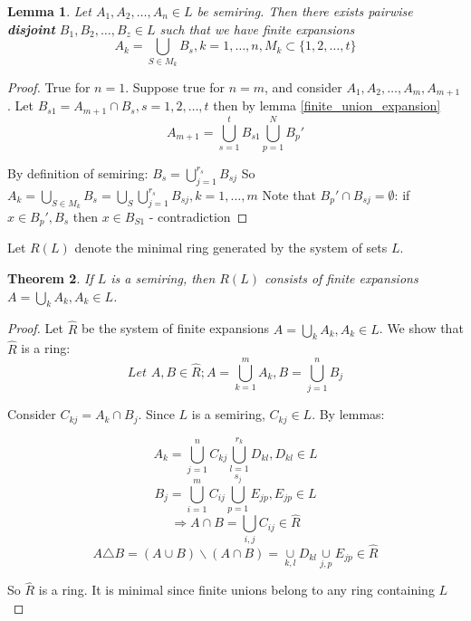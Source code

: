 \documentclass[11pt,a4paper]{report}
\newtheorem{theorem}{Theorem}[section]
\newtheorem{lemma}[theorem]{Lemma}
\theoremstyle{plain}
\theoremstyle{definition}
\theoremstyle{remark}
\begin{document}

\begin{lemma}
  \label{disjoint_countable_union_expansion}
  Let $A_1, A_2, \dots, A_n \in L$ be semiring.
  Then there exists pairwise \textbf{disjoint} $B_1, B_2, \dots, B_z \in L$ such that we have finite expansions
    \[ A_k = \underset{S\in M_k}{\bigcup}B_s, k=1, \dots, n, M_k \subset \{1,2,\dots, t\} \]
\end{lemma} 

\begin{proof}
    True for $n=1$.
    Suppose true for $n=m$, and consider $A_1, A_2, \dots, A_m, A_{m+1}$.
    Let $B_{s1} = A_{m+1} \cap B_s, s=1,2,\dots, t$
    then by lemma \ref{finite_union_expansion}
    \[ A_{m+1} = \bigcup_{s=1}^t B_{s1} \bigcup_{p=1}^N B_p' \]

    By definition of semiring: $B_s = \bigcup_{j=1}^{r_s} B_{sj}$
    So $A_k = \underset{S\in M_k}{\bigcup}B_s = \underset{S}{\bigcup}\bigcup_{j=1}^{r_s} B_{sj}, k=1,\dots, m$
    Note that $B_p' \cap B_{sj} = \emptyset$: if $x\in B_p', B_s$ then $x \in B_{S1}$ - contradiction
\end{proof}

Let $R(L)$ denote the minimal ring generated by the system of sets $L$.

\begin{theorem}
  If $L$ is a semiring, then $R(L)$ consists of finite expansions $A=\underset{k}{\bigcup} A_k, A_k \in L$.
\end{theorem}

\begin{proof}
  Let $\hat{R}$  be the system of finite expansions $A=\underset{k}{\bigcup} A_k, A_k \in L$. We show that $\hat{R}$ is a ring:\\

  \[ \textit{Let } A, B \in \hat{R}; A= \bigcup_{k=1}^m A_k, B=\bigcup_{j=1}^n B_j\]
  
  Consider $C_{kj}= A_k \cap B_j$. Since $L$ is a semiring, $C_{kj} \in L$.
  By lemmas: 

  \[ A_k = \bigcup_{j=1}^n C_{kj} \bigcup_{l=1}^{r_k} D_{kl}, D_{kl} \in L \]
  \[ B_j = \bigcup_{i=1}^m C_{ij} \bigcup_{p=1}^{s_j} E_{jp}, E_{jp} \in L \]
  \[ \Rightarrow A \cap B = \bigcup_{i,j} C_{ij} \in \hat{R} \]
  \[ A \triangle B = (A \cup B) \backslash (A \cap B) = \underset{k,l}{\cup} D_{kl} \underset{j,p}{\cup} E_{jp} \in \hat{R} \]

  So $\hat{R}$ is a ring. It is minimal since finite unions belong to any ring containing $L$
\end{proof}
\end{document}
